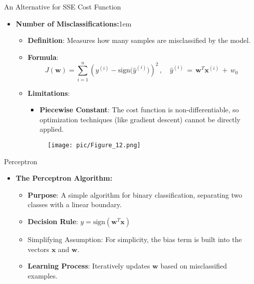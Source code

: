 \documentclass[serif, aspectratio=169]{beamer}
\begin{document}
\begin{frame}{An Alternative for SSE Cost Function}
    \begin{itemize}
        \item \textbf{Number of Misclassifications:}\itemsep1em
        \medskip
        \begin{itemize}\itemsep0.8em
            \item \textbf{Definition}:
            Measures how many samples are misclassified by the model.
            \item \textbf{Formula}:
                \[
                J(\mathbf{w}) = \sum_{i=1}^{n} (y^{(i)} - \text{sign(\(\hat{y}^{(i)})\)})^2 \, , \quad \hat{y}^{(i)} \, = \, \mathbf{w}^T\mathbf{x}^{(i)} \, + \, w_0
                \]
            \item \textbf{Limitations}: \\
            \begin{itemize}
                \item \justifying \textbf{Piecewise Constant}:
                The cost function is non-differentiable, so optimization techniques (like gradient descent) cannot be directly applied.
            \end{itemize}
            \endminipage
            \hspace{1cm}
            \begin{figure}[bh]
                \texttt{[image: pic/Figure\_12.png]}
            \end{figure}
            \endminipage
        \end{itemize}
    \end{itemize}
\end{frame}


\begin{frame}{Perceptron}
    \begin{itemize}
        \item \textbf{The Perceptron Algorithm:}
        \medskip
        \begin{itemize}\itemsep1em
            \item \textbf{Purpose}:
            A simple algorithm for binary classification, separating two classes with a linear boundary.
            \item \textbf{Decision Rule}:
            \(
            y = \text{sign}(\mathbf{w}^T \mathbf{x})
            \)
            \item Simplifying Assumption:
            For simplicity, the bias term is built into the vectors \( \mathbf{x} \) and \( \mathbf{w} \).
            \item \justifying \textbf{Learning Process}:
            Iteratively updates \( \mathbf{w} \) based on misclassified examples.
        \end{itemize}
    \end{itemize}
\end{frame}
\end{document}
